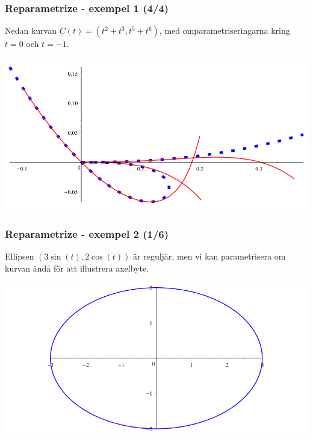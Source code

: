 \documentclass{beamer}
\begin{document}
\begin{frame}
	\frametitle{Reparametrize - exempel 1 (4/4)}
	
	\begin{example}
	Nedan kurvan $C(t)=(t^2+t^3,t^5+t^6)$, med omparametriseringarna kring $t=0$ och $t=-1$.
	
		\begin{center}
			\includegraphics[scale=0.35]{Export/kurvorplot2d1.png}
		\end{center}
	\end{example}
\end{frame}






\begin{frame}
	\frametitle{Reparametrize - exempel 2 (1/6)}
	
	\begin{example}
		Ellipsen $\left(3 \sin(t), 2 \cos(t)\right)$ är reguljär, men vi kan parametrisera om kurvan ändå för att illustrera axelbyte. 
  		
  		\begin{center}
  			\includegraphics[scale=0.35]{Export/kurvorplot2d2_0.png}
  		\end{center}
  	\end{example}
  \end{frame}
  
\end{document}
